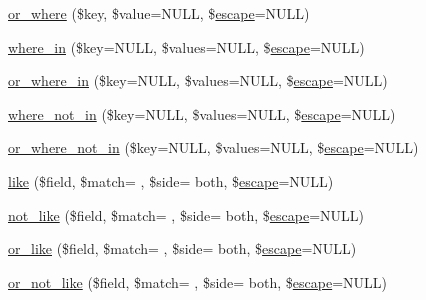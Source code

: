 \begin{DoxyCompactItemize}
\item 
\hyperlink{class_c_i___d_b__query__builder_a8d25e93a09f60fbe77541d0faef29bf0}{or\+\_\+where} (\$key, \$value=N\+U\+L\+L, \$\hyperlink{class_c_i___d_b__driver_ac8f37ca5703d4558c732e692194f8cd6}{escape}=N\+U\+L\+L)
\item 
\hyperlink{class_c_i___d_b__query__builder_ad74b2c2b21b33f4aa54229a323b7ba59}{where\+\_\+in} (\$key=N\+U\+L\+L, \$values=N\+U\+L\+L, \$\hyperlink{class_c_i___d_b__driver_ac8f37ca5703d4558c732e692194f8cd6}{escape}=N\+U\+L\+L)
\item 
\hyperlink{class_c_i___d_b__query__builder_a9c3f8f4d2f9b9b033a27a2d868278662}{or\+\_\+where\+\_\+in} (\$key=N\+U\+L\+L, \$values=N\+U\+L\+L, \$\hyperlink{class_c_i___d_b__driver_ac8f37ca5703d4558c732e692194f8cd6}{escape}=N\+U\+L\+L)
\item 
\hyperlink{class_c_i___d_b__query__builder_ab9f1b5e0622e0392796c5c9f4cca705a}{where\+\_\+not\+\_\+in} (\$key=N\+U\+L\+L, \$values=N\+U\+L\+L, \$\hyperlink{class_c_i___d_b__driver_ac8f37ca5703d4558c732e692194f8cd6}{escape}=N\+U\+L\+L)
\item 
\hyperlink{class_c_i___d_b__query__builder_ace5f568aace8a66636091e220fcd03c3}{or\+\_\+where\+\_\+not\+\_\+in} (\$key=N\+U\+L\+L, \$values=N\+U\+L\+L, \$\hyperlink{class_c_i___d_b__driver_ac8f37ca5703d4558c732e692194f8cd6}{escape}=N\+U\+L\+L)
\item 
\hyperlink{class_c_i___d_b__query__builder_a833856c9ac2aa0aa4b75c42149e3e2de}{like} (\$field, \$match= \textquotesingle{}\textquotesingle{}, \$side= \textquotesingle{}both\textquotesingle{}, \$\hyperlink{class_c_i___d_b__driver_ac8f37ca5703d4558c732e692194f8cd6}{escape}=N\+U\+L\+L)
\item 
\hyperlink{class_c_i___d_b__query__builder_ac30de36991c5c11d195b3aefe7a65b8a}{not\+\_\+like} (\$field, \$match= \textquotesingle{}\textquotesingle{}, \$side= \textquotesingle{}both\textquotesingle{}, \$\hyperlink{class_c_i___d_b__driver_ac8f37ca5703d4558c732e692194f8cd6}{escape}=N\+U\+L\+L)
\item 
\hyperlink{class_c_i___d_b__query__builder_a9c871134a85fe18a5413d4754baed8c7}{or\+\_\+like} (\$field, \$match= \textquotesingle{}\textquotesingle{}, \$side= \textquotesingle{}both\textquotesingle{}, \$\hyperlink{class_c_i___d_b__driver_ac8f37ca5703d4558c732e692194f8cd6}{escape}=N\+U\+L\+L)
\item 
\hyperlink{class_c_i___d_b__query__builder_a8ba35a82402da3afe51240acee96c3a1}{or\+\_\+not\+\_\+like} (\$field, \$match= \textquotesingle{}\textquotesingle{}, \$side= \textquotesingle{}both\textquotesingle{}, \$\hyperlink{class_c_i___d_b__driver_ac8f37ca5703d4558c732e692194f8cd6}{escape}=N\+U\+L\+L)

\end{DoxyCompactItemize}
